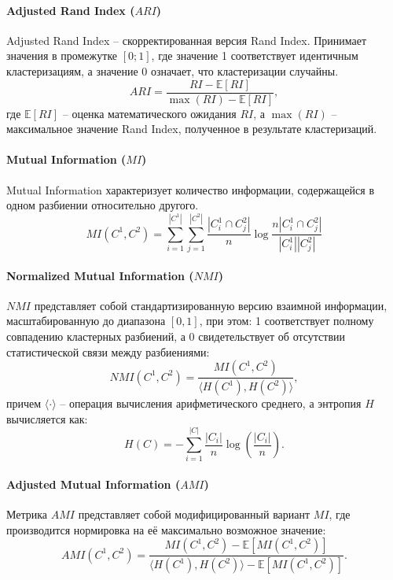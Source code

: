         \paragraph{Adjusted Rand Index (\(ARI\))}
            Adjusted Rand Index -- скорректированная версия Rand Index. Принимает значения в промежутке \([0; 1]\), где значение 1 соответствует идентичным кластеризациям, а значение 0 означает, что кластеризации случайны.
            \begin{equation}
                ARI = \frac{RI - \mathbb{E}[RI]}{\max(RI)- \mathbb{E}[RI]},
            \end{equation}
            где \(\mathbb{E}[RI]\) -- оценка математического ожидания \(RI\), а \(\max(RI)\) -- максимальное значение Rand Index, полученное в результате кластеризаций.

        \paragraph{Mutual Information (\(MI\))}
            Mutual Information характеризует количество информации, содержащейся в одном разбиении относительно другого.
            \begin{equation}
                MI(C^1, C^2) = \displaystyle\sum_{i=1}^{|C^1|} \displaystyle\sum_{j=1}^{|C^2|} \frac{|C^1_i \cap C^2_j|}{n} \log\frac{n|C^1_i \cap C^2_j|}{|C^1_i||C^2_j|}
            \end{equation}

        \paragraph{Normalized Mutual Information (\(NMI\))}
            \(NMI\) представляет собой стандартизированную версию взаимной информации, масштабированную до диапазона \([0,1]\), при этом: 1 соответствует полному совпадению кластерных разбиений, а 0 свидетельствует об отсутствии статистической связи между разбиениями:
            \begin{equation}
                NMI(C^1, C^2) = \frac{MI(C^1, C^2)}{\langle H(C^1), H(C^2) \rangle},
            \end{equation}
            причем \(\langle \cdot \rangle\) -- операция вычисления арифметического среднего, а энтропия \(H\) вычисляется как:
            \begin{equation}
                H(C) = -\sum_{i=1}^{|C|} \frac{|C_i|}{n} \log\left(\frac{|C_i|}{n}\right).
            \end{equation}

        \paragraph{Adjusted Mutual Information (\(AMI\))}
            Метрика \(AMI\) представляет собой модифицированный вариант \(MI\), где производится нормировка на её максимально возможное значение:
            \begin{equation}
                AMI(C^1, C^2) = \frac{MI(C^1, C^2) - \mathbb{E}[MI(C^1, C^2)]}{ \langle H(C^1), H(C^2) \rangle - \mathbb{E}[MI(C^1, C^2)]}.
            \end{equation}
